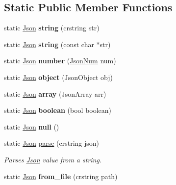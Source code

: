 \subsection*{Static Public Member Functions}
\begin{DoxyCompactItemize}
\item 
\mbox{\label{classnta_1_1utils_1_1Json_add20ea70d84582b2446dc53be92ac50c}} 
static \hyperlink{classnta_1_1utils_1_1Json}{Json} {\bfseries string} (crstring str)
\item 
\mbox{\label{classnta_1_1utils_1_1Json_a84415d3c83a91fed0689276c538e886e}} 
static \hyperlink{classnta_1_1utils_1_1Json}{Json} {\bfseries string} (const char $\ast$str)
\item 
\mbox{\label{classnta_1_1utils_1_1Json_a5e985dfb6c9148df9401b89265a0852c}} 
static \hyperlink{classnta_1_1utils_1_1Json}{Json} {\bfseries number} (\hyperlink{classnta_1_1utils_1_1JsonNum}{Json\+Num} num)
\item 
\mbox{\label{classnta_1_1utils_1_1Json_ac5e29dac15a59829e1f6e927fe8cde5d}} 
static \hyperlink{classnta_1_1utils_1_1Json}{Json} {\bfseries object} (Json\+Object obj)
\item 
\mbox{\label{classnta_1_1utils_1_1Json_a2a99930e97628a41cf647cbdb52d8a76}} 
static \hyperlink{classnta_1_1utils_1_1Json}{Json} {\bfseries array} (Json\+Array arr)
\item 
\mbox{\label{classnta_1_1utils_1_1Json_a023ca360caf8dbb385a805b0c21c98c3}} 
static \hyperlink{classnta_1_1utils_1_1Json}{Json} {\bfseries boolean} (bool boolean)
\item 
\mbox{\label{classnta_1_1utils_1_1Json_a89aa8497a420120774eec8335a6bf42e}} 
static \hyperlink{classnta_1_1utils_1_1Json}{Json} {\bfseries null} ()
\item 
\mbox{\label{classnta_1_1utils_1_1Json_ac4e9f86cd5c15c077f993d86a68eb044}} 
static \hyperlink{classnta_1_1utils_1_1Json}{Json} \hyperlink{classnta_1_1utils_1_1Json_ac4e9f86cd5c15c077f993d86a68eb044}{parse} (crstring json)
\begin{DoxyCompactList}\small\item\em Parses \hyperlink{classnta_1_1utils_1_1Json}{Json} value from a string. \end{DoxyCompactList}\item 
\mbox{\label{classnta_1_1utils_1_1Json_a1f9c21e0ba80e348e2c6c19070cbc45e}} 
static \hyperlink{classnta_1_1utils_1_1Json}{Json} {\bfseries from\+\_\+file} (crstring path)
\end{DoxyCompactItemize}
